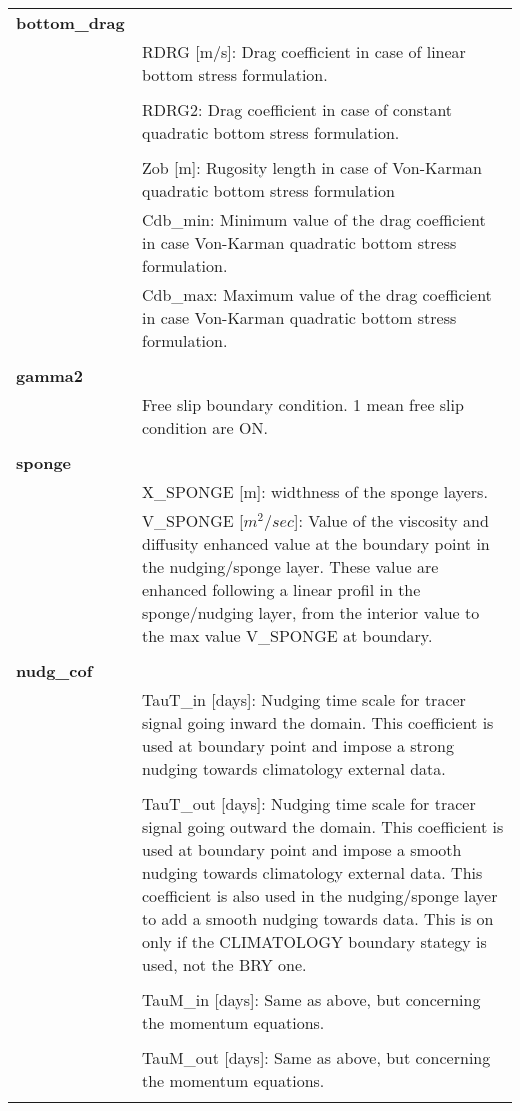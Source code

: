 \begin{longtable}{|p{0.25\linewidth}|p{0.75\linewidth}|}
\large{\textbf{bottom\_drag}} &     \\ 
& RDRG [m/s]: Drag coefficient in case of linear bottom stress formulation. \\
& \\
& RDRG2: Drag coefficient in case of constant quadratic bottom stress formulation. \\
& \\
& Zob [m]: Rugosity length in case of Von-Karman quadratic bottom stress formulation \\
& Cdb\_min: Minimum value of the drag coefficient in case Von-Karman quadratic bottom stress formulation. \\
& Cdb\_max: Maximum value of the drag coefficient in case Von-Karman quadratic bottom stress formulation. \\
&  \\ 

\large{\textbf{gamma2}} &     \\ 
&  Free slip boundary condition. 1 mean free slip condition are ON. \\
&  \\ 
\large{\textbf{sponge}} &     \\
&     X\_SPONGE [m]: widthness of the sponge layers.\\
&     V\_SPONGE [$m^2/sec$]: Value of the viscosity and diffusity enhanced value at
the boundary point in the nudging/sponge layer. These value are enhanced following a
linear profil in the sponge/nudging layer, from the interior value to the max value
V\_SPONGE at boundary.\\
&  \\ 

\large{\textbf{nudg\_cof}} &     \\
& TauT\_in  [days]: Nudging time scale for tracer signal going inward the
domain. This coefficient is used at boundary point and impose a
strong nudging towards climatology external data.  \\
& \\
& TauT\_out [days]: Nudging time scale for tracer signal going outward the domain. This coefficient is used at boundary point and impose a
smooth nudging towards climatology external data. This coefficient is also used in
the nudging/sponge layer to add a smooth nudging towards data. This is on only if the
CLIMATOLOGY boundary stategy is used, not the BRY one.\\
& \\
& TauM\_in  [days]: Same as above, but concerning the momentum equations. \\
& \\
& TauM\_out [days]: Same as above, but concerning the momentum equations. \\
&  \\ 


\end{longtable}
